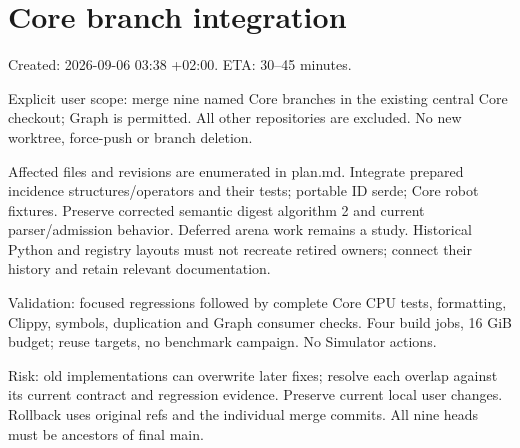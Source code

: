 \documentclass{article}
\begin{document}
\section*{Core branch integration}
Created: 2026-09-06 03:38 +02:00. ETA: 30--45 minutes.

Explicit user scope: merge nine named Core branches in the existing central Core checkout; Graph is permitted. All other repositories are excluded. No new worktree, force-push or branch deletion.

Affected files and revisions are enumerated in plan.md. Integrate prepared incidence structures/operators and their tests; portable ID serde; Core robot fixtures. Preserve corrected semantic digest algorithm 2 and current parser/admission behavior. Deferred arena work remains a study. Historical Python and registry layouts must not recreate retired owners; connect their history and retain relevant documentation.

Validation: focused regressions followed by complete Core CPU tests, formatting, Clippy, symbols, duplication and Graph consumer checks. Four build jobs, 16 GiB budget; reuse targets, no benchmark campaign. No Simulator actions.

Risk: old implementations can overwrite later fixes; resolve each overlap against its current contract and regression evidence. Preserve current local user changes. Rollback uses original refs and the individual merge commits. All nine heads must be ancestors of final main.
\end{document}
